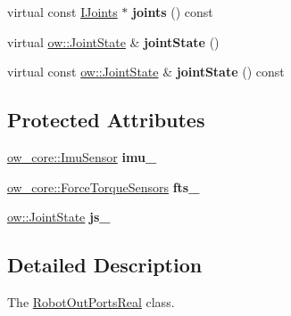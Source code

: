 \begin{DoxyCompactItemize}
\item 
virtual const \hyperlink{classow__core_1_1IJoints}{I\+Joints} $\ast$ {\bfseries joints} () const \hypertarget{classow__core_1_1RobotOutPortsReal_a8df6cdf2b917c01630d7eafbe5c3f9df}{}\label{classow__core_1_1RobotOutPortsReal_a8df6cdf2b917c01630d7eafbe5c3f9df}

\item 
virtual \hyperlink{classow__core_1_1JointState}{ow\+::\+Joint\+State} \& {\bfseries joint\+State} ()\hypertarget{classow__core_1_1RobotOutPortsReal_aa83eb2299031d87be7dd88a43f9d2e84}{}\label{classow__core_1_1RobotOutPortsReal_aa83eb2299031d87be7dd88a43f9d2e84}

\item 
virtual const \hyperlink{classow__core_1_1JointState}{ow\+::\+Joint\+State} \& {\bfseries joint\+State} () const \hypertarget{classow__core_1_1RobotOutPortsReal_ab38ad9e62a901c95cccd63d9a6f28c5b}{}\label{classow__core_1_1RobotOutPortsReal_ab38ad9e62a901c95cccd63d9a6f28c5b}

\end{DoxyCompactItemize}
\subsection*{Protected Attributes}
\begin{DoxyCompactItemize}
\item 
\hyperlink{classow__core_1_1ImuSensor}{ow\+\_\+core\+::\+Imu\+Sensor} {\bfseries imu\+\_\+}\hypertarget{classow__core_1_1RobotOutPortsReal_a4eaac66c91f5464eb1b08e294c692732}{}\label{classow__core_1_1RobotOutPortsReal_a4eaac66c91f5464eb1b08e294c692732}

\item 
\hyperlink{classow__core_1_1ForceTorqueSensors}{ow\+\_\+core\+::\+Force\+Torque\+Sensors} {\bfseries fts\+\_\+}\hypertarget{classow__core_1_1RobotOutPortsReal_a69818c3bd63c8546528d0b14c6155de0}{}\label{classow__core_1_1RobotOutPortsReal_a69818c3bd63c8546528d0b14c6155de0}

\item 
\hyperlink{classow__core_1_1JointState}{ow\+::\+Joint\+State} {\bfseries js\+\_\+}\hypertarget{classow__core_1_1RobotOutPortsReal_affd22401b69ff18267dc4cc6383dc769}{}\label{classow__core_1_1RobotOutPortsReal_affd22401b69ff18267dc4cc6383dc769}

\end{DoxyCompactItemize}


\subsection{Detailed Description}
The \hyperlink{classow__core_1_1RobotOutPortsReal}{Robot\+Out\+Ports\+Real} class. 

